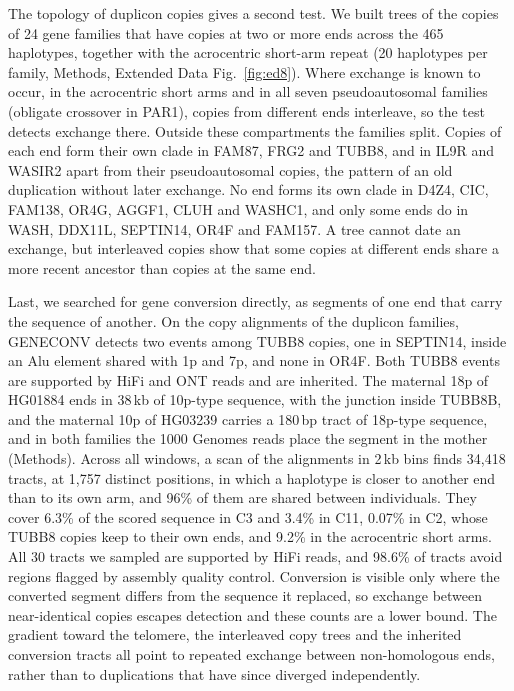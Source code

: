 \documentclass[pdflatex,mathphys]{jnl}
\begin{document}
The topology of duplicon copies gives a second test. We built trees of the copies of
24 gene families that have copies at two or more ends across the 465 haplotypes, together with the
acrocentric short-arm repeat (20 haplotypes per family, Methods, Extended Data Fig.~\ref{fig:ed8}).
Where exchange is known to occur, in the acrocentric short arms and in all seven pseudoautosomal families
(obligate crossover in PAR1), copies from different ends interleave, so the test detects exchange there.
Outside these compartments the families split. Copies of each end form their own clade in FAM87,
FRG2 and TUBB8, and in IL9R and WASIR2 apart from their pseudoautosomal copies, the pattern of an old
duplication without later exchange. No end forms its own clade in D4Z4, CIC, FAM138, OR4G, AGGF1, CLUH
and WASHC1, and only some ends do in WASH, DDX11L, SEPTIN14, OR4F and FAM157. A tree cannot date an
exchange, but interleaved copies show that some copies at different ends share a more recent ancestor
than copies at the same end.

Last, we searched for gene conversion directly, as segments of one end that carry the sequence of
another. On the copy alignments of the duplicon families, GENECONV \cite{Sawyer1989} detects two
events among TUBB8 copies, one in SEPTIN14, inside an Alu element shared with 1p and 7p, and none
in OR4F. Both TUBB8
events are supported by HiFi and ONT reads and are inherited. The maternal 18p of HG01884 ends in
38\,kb of 10p-type sequence, with the junction inside TUBB8B, and the maternal 10p of HG03239 carries
a 180\,bp tract of 18p-type sequence, and in both families the 1000 Genomes reads place the segment
in the mother (Methods). Across all windows, a scan of the alignments in 2\,kb bins finds 34,418
tracts, at 1,757 distinct positions, in which a haplotype is closer to another end than to its own
arm, and 96\% of them are shared between individuals. They cover 6.3\% of the scored sequence in C3
and 3.4\% in C11, 0.07\% in C2, whose TUBB8 copies keep to their own ends, and 9.2\% in the
acrocentric short arms. All 30 tracts we sampled are supported by HiFi reads, and 98.6\% of tracts
avoid regions flagged by assembly quality control. Conversion is visible only where the converted
segment differs from the sequence it replaced, so exchange between near-identical copies escapes
detection \cite{Mansai2010} and these counts are a lower bound. The gradient toward the telomere, the interleaved
copy trees and the inherited conversion tracts all point to repeated exchange between non-homologous
ends, rather than to duplications that have since diverged independently.
\end{document}
